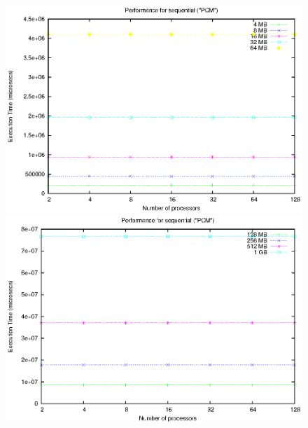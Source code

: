 \begin{figure}[t]
    \begin{center}
        \includegraphics[scale=0.6]{plots/test_01_PCM/NxTxM/sequential_PCM_NxTxM_small}
    \end{center}
    
    \begin{center}
        \includegraphics[scale=0.6]{plots/test_01_PCM/NxTxM/sequential_PCM_NxTxM_large}
    \end{center}
    

\end{figure}
